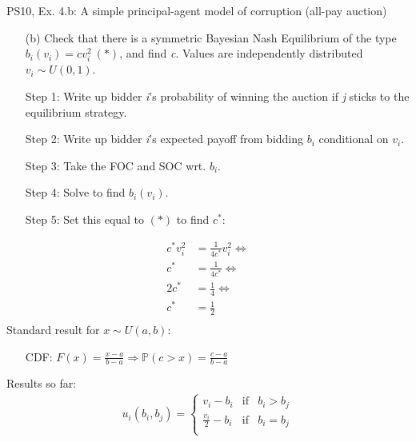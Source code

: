 \begin{frame}{PS10, Ex. 4.b: A simple principal-agent model of corruption (all-pay auction)}
    \begin{itemize}
      \item[(b)] Check that there is a symmetric Bayesian Nash Equilibrium of the type $b_i(v_i) = cv_i^2\ (*)$, and find \textit{c}. Values are independently distributed $v_i\sim U(0, 1)$.
    \end{itemize} \vspace{-8pt}
    \begin{multicols}{2}
      \begin{itemize}
        \item[Step 1:] Write up bidder \textit{i}'s probability of winning the auction if \textit{j} sticks to the equilibrium strategy.
        \item[Step 2:] Write up bidder \textit{i}'s expected payoff from bidding $b_i$ conditional on $v_i$.
        \item[Step 3:] Take the FOC and SOC wrt. $b_i$.
        \item[Step 4:] Solve to find $b_i(v_i)$.
        \item[Step 5:] Set this equal to $(*)$ to find $c^*$:
      \end{itemize} \vspace{-6pt}
      \begin{align*}
        c^*v_i^2&=\frac{1}{4c^*}v_i^2\Leftrightarrow\\
        c^*&=\frac{1}{4c^*}\Leftrightarrow\\
        2c^*&=\frac{1}{4}\Leftrightarrow\\
        c^*&=\frac{1}{2}\\
      \end{align*}
      \vfill\null\columnbreak
      Standard result for $x\sim U(a, b):$ \vspace{-6pt}
      \begin{itemize}
        \item[CDF:] $F(x)=\frac{x-a}{b-a}\Rightarrow\mathbb{P}(c>x)=\frac{c-a}{b-a}$
      \end{itemize}
      \vspace{-6pt}
      Results so far: \vspace{-6pt}
      \begin{align*}
        u_i(b_i,b_j)=\left\{\begin{array}{lcl}
          v_i-b_i           & \text{if} & b_i>b_j \\
          \frac{v_i}{2}-b_i & \text{if} & b_i=b_j \\

\end{array}
\end{align*}
\end{multicols}
\end{frame}
